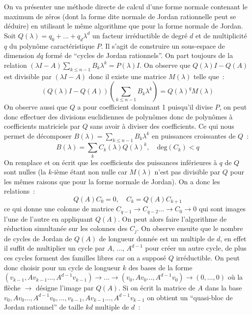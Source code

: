 \documentclass[a4paper,11pt]{article}
\begin{document}
On va pr\'esenter une m\'ethode directe de calcul d'une forme normale
contenant le maximum de z\'eros (dont la forme dite normale de Jordan
rationnelle peut se d\'eduire) en utilisant le m\^eme algorithme que pour 
la forme
normale de Jordan. Soit $Q(\lambda)=q_0+...+q_d \lambda^d$ 
un facteur irr\'eductible
de degr\'e $d$ et de multiplicit\'e $q$ 
du polyn\^ome caract\'eristique $P$. Il
s'agit de construire un sous-espace de dimension $dq$ form\'e de ``cycles
de Jordan rationnels''.
On part toujours de la relation 
$(\lambda I -A) \sum_{k\leq n-1} B_k \lambda^k=P(\lambda)I$.
On observe que $Q(\lambda)I-Q(A)$ est divisible par $(\lambda I -A) $
donc il existe une matrice $M(\lambda)$ telle que~:
\[ (Q(\lambda) I -Q(A)) (\sum_{k\leq n-1} B_k \lambda^k)
=Q(\lambda)^q M(\lambda) \]
On observe aussi que $Q$ a pour coefficient dominant 1 puisqu'il divise
$P$, on peut donc effectuer des divisions euclidiennes de polyn\^omes
donc de polyn\^omes \`a coefficients matriciels par $Q$ sans avoir
\`a diviser des coefficients. Ce qui nous
permet de d\'ecomposer $B(\lambda)=\sum_{k\leq n-1} B_k \lambda^k$ en 
puissances croissantes de $Q$~:
\[ B(\lambda)=\sum_k C_k(\lambda) Q(\lambda)^k, \quad \mbox{deg}(C_k)<q \]
On remplace et on \'ecrit que les coefficients des puissances inf\'erieures
\`a $q$ de $Q$ sont nulles (la $k$-i\`eme \'etant non nulle
car $M(\lambda)$ n'est pas divisible par $Q$ pour les m\^emes raisons
que pour la forme normale de Jordan). On a donc les relations~:
\[ Q(A)C_0 = 0, \quad C_k = Q(A) C_{k+1} \]
ce qui donne une colonne de matrice 
$C_{q-1} \rightarrow C_{q-2} ... \rightarrow C_0 \rightarrow 0$
qui sont images l'une de l'autre en appliquant $Q(A)$. On peut alors
faire l'algorithme de r\'eduction simultan\'ee sur les colonnes des $C_j$. 
On observe
ensuite que le nombre de cycles de Jordan de $Q(A)$ de longueur donn\'ee 
est un multiple de $d$, en effet il suffit de multiplier
un cycle par $A$, ..., $A^{d-1}$ pour cr\'eer un autre cycle, de plus ces
cycles forment des familles libres car on a suppos\'e $Q$ irr\'eductible.
On peut donc choisir pour un cycle de longueur $k$ des bases de la forme
$(v_{k-1},Av_{k-1}...,A^{d-1}v_{k-1}) \rightarrow ... 
\rightarrow (v_{0},Av_{0}...,A^{d-1}v_{0}) \rightarrow (0,...,0) $
o\`u la fl\`eche $\rightarrow$ d\'esigne l'image par $Q(A)$.
Si on \'ecrit la matrice de $A$ dans la base 
$v_{0},Av_{0}...,A^{d-1}v_{0},...,v_{k-1},Av_{k-1}...,A^{d-1}v_{k-1}$
on obtient un ``quasi-bloc de Jordan rationnel'' de taille $kd$ 
multiple de $d$~:
\end{document}
